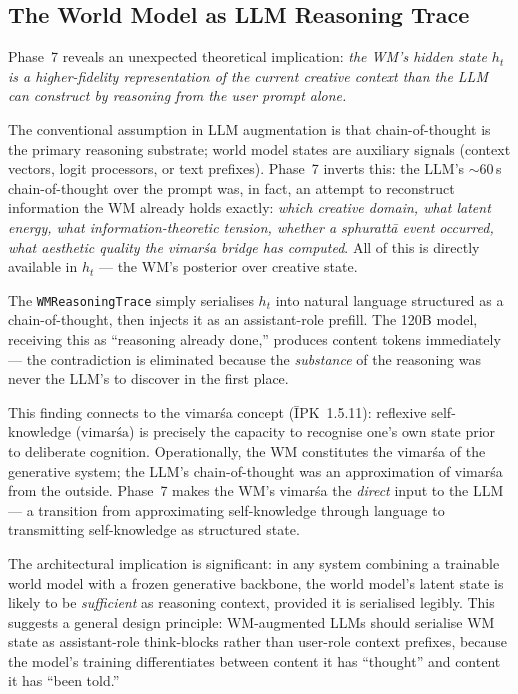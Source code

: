 \documentclass[journal,onecolumn,11pt]{IEEEtran}
\begin{document}
\subsection{The World Model as LLM Reasoning Trace}\label{sec:wm-as-cot}

Phase~7 reveals an unexpected theoretical implication: \emph{the WM's hidden state
$h_t$ is a higher-fidelity representation of the current creative context than the
LLM can construct by reasoning from the user prompt alone.}

The conventional assumption in LLM augmentation is that chain-of-thought is the
primary reasoning substrate; world model states are auxiliary signals (context
vectors, logit processors, or text prefixes).
Phase~7 inverts this: the LLM's $\sim$60\,s chain-of-thought over the prompt was,
in fact, an attempt to reconstruct information the WM already holds exactly:
\emph{which creative domain, what latent energy, what information-theoretic
tension, whether a sphurattā event occurred, what aesthetic quality the vimarśa
bridge has computed}.
All of this is directly available in $h_t$ — the WM's posterior over creative state.

The \texttt{WMReasoningTrace} simply serialises $h_t$ into natural language
structured as a chain-of-thought, then injects it as an assistant-role prefill.
The 120B model, receiving this as ``reasoning already done,'' produces content
tokens immediately — the contradiction is eliminated because the \emph{substance}
of the reasoning was never the LLM's to discover in the first place.

This finding connects to the vimarśa concept (ĪPK~1.5.11): reflexive self-knowledge
($\text{vimarśa}$) is precisely the capacity to recognise one's own state prior
to deliberate cognition.
Operationally, the WM constitutes the vimarśa of the generative system; the LLM's
chain-of-thought was an approximation of vimarśa from the outside.
Phase~7 makes the WM's vimarśa the \emph{direct} input to the LLM — a transition
from approximating self-knowledge through language to transmitting self-knowledge
as structured state.

The architectural implication is significant: in any system combining a trainable
world model with a frozen generative backbone, the world model's latent state is
likely to be \emph{sufficient} as reasoning context, provided it is serialised
legibly.
This suggests a general design principle: WM-augmented LLMs should serialise WM
state as assistant-role think-blocks rather than user-role context prefixes, because
the model's training differentiates between content it has ``thought'' and content
it has ``been told.''
\end{document}
